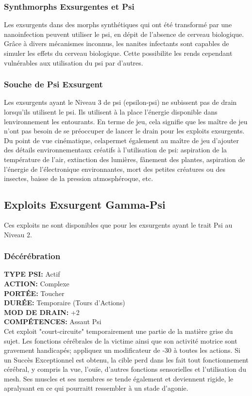 \subsubsection{Synthmorphs Exsurgentes et Psi} 

Les exsurgents dans des morphs synthétiques qui ont été transformé par une nanoinfection peuvent utiliser le psi, en dépit de l'absence de cerveau biologique. Grâce à divers mécanismes inconnus, les nanites infectants sont capables de simuler les effets du cerveau biologique. Cette possibilite les rends cependant vulnérables aux utilisation du psi par d'autres. 

\subsubsection{Souche de Psi Exsurgent} 

Les exsurgents ayant le Niveau 3 de psi (epsilon-psi) ne subissent pas de drain lorsqu'ils utilisent le psi. Ils utilisent à la place l'énergie disponible dans lenvironnement les entourants. En terme de jeu, cela signifie que les maître de jeu n'ont pas besoin de se préoccuper de lancer le drain pour les exploits exsurgents. Du point de vue cinématique, celapermet également au maître de jeu d'ajouter des détails environnementaux créatifs à l'utilisation de psi: aspiration de la température de l'air, extinction des lumières, fânement des plantes, aspiration de l'énergie de l'électronique environnantes, mort des petites créatures ou des insectes, baisse de la pression atmosphéroque, etc. 

\subsection{Exploits Exsurgent Gamma-Psi} 

Ces exploits ne sont disponibles que pour les exsurgents ayant le trait Psi au Niveau 2. 

\subsubsection{Décérébration } \textbf{TYPE PSI:} Actif \\ \textbf{ACTION:} Complexe \\ \textbf{PORTÉE:} Toucher \\ \textbf{DURÉE:} Temporaire (Tours d'Actions) \\ \textbf{MOD DE DRAIN:} +2 \\ \textbf{COMPÉTENCES:} Assaut Psi \\ Cet exploit "court-circuite" temporairement une partie de la matière grise du sujet. Les fonctions cérébrales de la victime ainsi que son activité motrice sont gravement handicapés; appliquez un modificateur de -30 à toutes les actions. Si un Succès Exceptionnel est obtenu, la cible perd dans les fait tout fonctionnement cérébral, y compris la vue, l'ouïe, d'autres fonctions sensorielles et l'utilisation du mesh. Ses muscles et ses membres se tende également et deviennent rigide, le apralysant en ce qui pourraitt ressembler à un stade d'agonie. 

